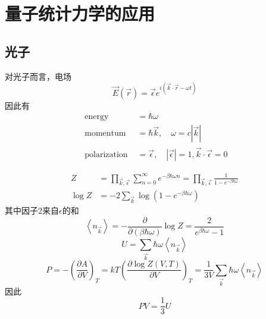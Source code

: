 \documentclass[12pt, a4paper, oneside]{ctexbook}
\newcounter{#2}
\newcounter{#2}[#1]
\numberwithin{#2}{#1}
\newcommand{\jkuo}[1]{\left\langle#1\right\rangle}
\begin{document}
          \chapter{量子统计力学的应用}

          \section{光子}

          \begin{claim}
            对光子而言，电场
            \begin{equation}
              \vec{E}(\vec{r}) =\vec{\epsilon} e^{i(\vec{k} \cdot \vec{r}-\omega t)} 
            \end{equation}
            因此有
            \begin{equation}
              \begin{aligned}
                \text { energy } & =\hbar \omega \\
                \text { momentum } & =\hbar \vec{k}, \quad \omega=c|\vec{k}| \\
                \text { polarization } & =\vec{\epsilon}, \quad|\vec{\epsilon}|=1, \vec{k} \cdot \vec{\epsilon}=0
                \end{aligned}
            \end{equation}
          \end{claim}
          \begin{deduce}
            
            \begin{equation}
              \begin{aligned}
                Z & =\prod_{\vec{k}, \vec{\epsilon}} \sum_{n=0}^{\infty} e^{-\beta \hbar \omega n}=\prod_{\vec{k}, \vec{\epsilon}} \frac{1}{1-e^{-\beta \hbar \omega}} \\
                \log Z & =-2 \sum_{\vec{k}} \log \left(1-e^{-\beta \hbar \omega}\right)
                \end{aligned}
            \end{equation}
            其中因子2来自\(\epsilon\)的和
            \begin{equation}
              \left\langle n_{\vec{k}}\right\rangle=-\frac{\partial}{\partial(\beta \hbar \omega)} \log Z=\frac{2}{e^{\beta \hbar \omega}-1}
            \end{equation}
            \begin{equation}
              U=\sum_{\vec k}\hbar\omega\jkuo{n_{\vec k}}
            \end{equation}
            \begin{equation}
              P=-\left(\frac{\partial A}{\partial V}\right)_T=k T\left(\frac{\partial \log Z(V, T)}{\partial V}\right)_T=\frac{1}{3V}\sum_{\vec k}\hbar\omega\jkuo{n_{\vec k}}
            \end{equation}
            因此 
            \begin{equation}
              PV=\frac13U
            \end{equation}
          \end{deduce}
\end{document}
